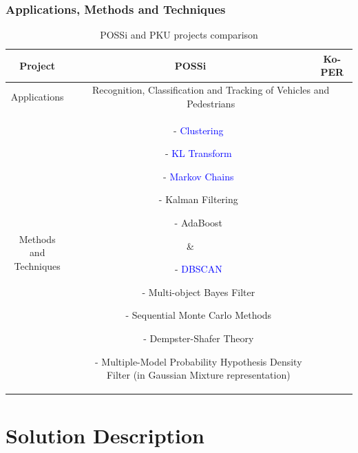 \documentclass[table]{beamer}
\begin{document}
\frame
{
	\frametitle{Applications, Methods and Techniques}
	
	\scriptsize{
	\begin{table}	
	\begin{tabular}{|c|c|c|}
	\hline
	Project & POSSi & Ko-PER \\
	\hline
	Applications & \multicolumn{2}{c|}{\parbox{6cm}{Recognition, Classification and Tracking of Vehicles and Pedestrians}} \\
	\hline
	\parbox{2.5cm}{Methods and \\Techniques}
	& \parbox{2.5cm}{\begin{itemize}[leftmargin=.07in]
		\item[-] \textcolor{blue}{Clustering}
		\item[-] \textcolor{blue}{KL Transform}
		\item[-] \textcolor{blue}{Markov Chains}
		\item[-] Kalman Filtering
		\item[-] AdaBoost
	\end{itemize}
	}
	& \parbox{3.5cm}{
	\begin{itemize}[leftmargin=.07in]
		\item[-] \textcolor{blue}{DBSCAN}
		\item[-] Multi-object Bayes Filter
		\item[-] Sequential Monte Carlo Methods
		\item[-] Dempster-Shafer Theory
		\item[-] Multiple-Model Probability Hypothesis Density Filter (in Gaussian Mixture representation)
	\end{itemize}
	}\\
	\hline
	
	\end{tabular}
	\caption{POSSi and PKU projects comparison}	
	\end{table}
	}
}

\section{Solution Description}
\end{document}
